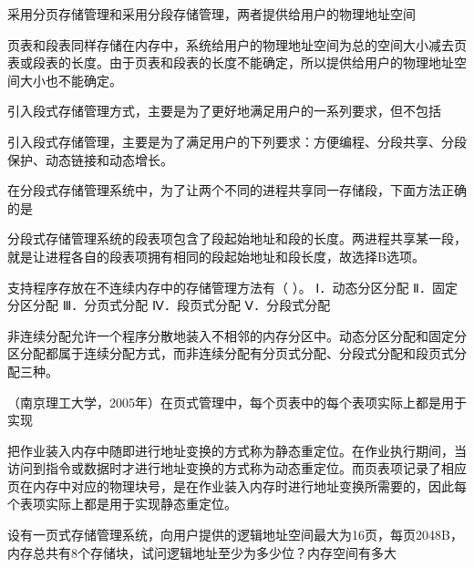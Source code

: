 \question 采用分页存储管理和采用分段存储管理，两者提供给用户的物理地址空间
\par{}
\begin{solution}页表和段表同样存储在内存中，系统给用户的物理地址空间为总的空间大小减去页表或段表的长度。由于页表和段表的长度不能确定，所以提供给用户的物理地址空间大小也不能确定。
\end{solution}
\question 引入段式存储管理方式，主要是为了更好地满足用户的一系列要求，但不包括
\par{}
\begin{solution}引入段式存储管理，主要是为了满足用户的下列要求：方便编程、分段共享、分段保护、动态链接和动态增长。
\end{solution}
\question 在分段式存储管理系统中，为了让两个不同的进程共享同一存储段，下面方法正确的是
\par{}
\begin{solution}分段式存储管理系统的段表项包含了段起始地址和段的长度。两进程共享某一段，就是让进程各自的段表项拥有相同的段起始地址和段长度，故选择B选项。
\end{solution}
\question 支持程序存放在不连续内存中的存储管理方法有（ ）。 Ⅰ．动态分区分配
Ⅱ．固定分区分配 Ⅲ．分页式分配 Ⅳ．段页式分配 Ⅴ．分段式分配
\par{}
\begin{solution}非连续分配允许一个程序分散地装入不相邻的内存分区中。动态分区分配和固定分区分配都属于连续分配方式，而非连续分配有分页式分配、分段式分配和段页式分配三种。
\end{solution}
\question （南京理工大学，2005年）在页式管理中，每个页表中的每个表项实际上都是用于实现
\par{}
\begin{solution}把作业装入内存中随即进行地址变换的方式称为静态重定位。在作业执行期间，当访问到指令或数据时才进行地址变换的方式称为动态重定位。而页表项记录了相应页在内存中对应的物理块号，是在作业装入内存时进行地址变换所需要的，因此每个表项实际上都是用于实现静态重定位。
\end{solution}
\question 设有一页式存储管理系统，向用户提供的逻辑地址空间最大为16页，每页2048B，内存总共有8个存储块，试问逻辑地址至少为多少位？内存空间有多大
